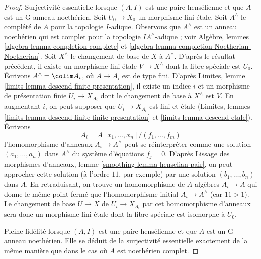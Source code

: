 \begin{proof}
\medskip\noindent
Surjectivité essentielle lorsque $(A, I)$ est une paire hensélienne
et que $A$ est un G-anneau noethérien.
Soit $U_0 \to X_0$ un morphisme fini étale.
Soit $A^\wedge$ le complété de $A$ pour la topologie $I$-adique.
Observons que $A^\wedge$ est un anneau noethérien qui est
complet pour la topologie $IA^\wedge$-adique ; voir Algèbre, lemmes
\ref{algebra-lemma-completion-complete} et
\ref{algebra-lemma-completion-Noetherian-Noetherian}.
Soit $X^\wedge$ le changement de base de $X$ à $A^\wedge$.
D'après le résultat précédent, il existe un morphisme fini étale
$V \to X^\wedge$ dont la fibre spéciale est $U_0$.
Écrivons $A^\wedge = \colim A_i$, où $A \to A_i$ est de type fini.
D'après Limites, lemme \ref{limits-lemma-descend-finite-presentation},
il existe un indice $i$ et un morphisme de présentation finie $U_i \to X_{A_i}$
dont le changement de base à $X^\wedge$ est $V$. En augmentant $i$,
on peut supposer que $U_i \to X_{A_i}$ est fini et étale
(Limites, lemmes \ref{limits-lemma-descend-finite-finite-presentation} et
\ref{limits-lemma-descend-etale}). Écrivons
$$
A_i = A[x_1, \ldots, x_n]/(f_1, \ldots, f_m)
$$
l'homomorphisme d'anneaux $A_i \to A^\wedge$ peut se réinterpréter comme une solution
$(a_1, \ldots, a_n)$ dans $A^\wedge$ du système d'équations $f_j = 0$.
D'après Lissage des morphismes d'anneaux, lemme \ref{smoothing-lemma-henselian-pair},
on peut approcher cette solution (à l'ordre $11$, par exemple) par une solution
$(b_1, \ldots, b_n)$ dans $A$. En retraduisant, on trouve un homomorphisme de $A$-algèbres
$A_i \to A$ qui donne le même point fermé que l'homomorphisme initial
$A_i \to A^\wedge$ (car $11 > 1$). Le changement de base $U \to X$ de $U_i \to X_{A_i}$
par cet homomorphisme d'anneaux sera donc un morphisme fini étale dont la
fibre spéciale est isomorphe à $U_0$.

\medskip\noindent
Pleine fidélité lorsque $(A, I)$ est une paire hensélienne et que $A$ est un
G-anneau noethérien. Elle se déduit de la surjectivité essentielle exactement de la même
manière que dans le cas où $A$ est noethérien complet.


\end{proof}
